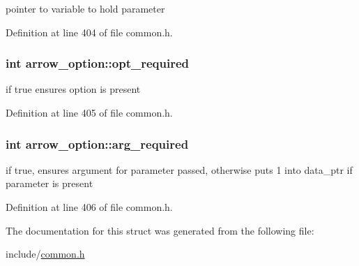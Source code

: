 pointer to variable to hold parameter 

Definition at line 404 of file common.h.\hypertarget{structarrow__option_2e7290d4b7088eab30df5f3bfc34ce93}{
\subsubsection{\setlength{\rightskip}{0pt plus 5cm}int {\bf arrow\_\-option::opt\_\-required}}}
\label{structarrow__option_2e7290d4b7088eab30df5f3bfc34ce93}


if true ensures option is present 

Definition at line 405 of file common.h.\hypertarget{structarrow__option_59aa495c8bd2e4d57014e4d9278020ed}{
\subsubsection{\setlength{\rightskip}{0pt plus 5cm}int {\bf arrow\_\-option::arg\_\-required}}}
\label{structarrow__option_59aa495c8bd2e4d57014e4d9278020ed}


if true, ensures argument for parameter passed, otherwise puts 1 into data\_\-ptr if parameter is present 

Definition at line 406 of file common.h.

The documentation for this struct was generated from the following file:\begin{CompactItemize}
\item 
include/\hyperlink{common_8h}{common.h}\end{CompactItemize}
